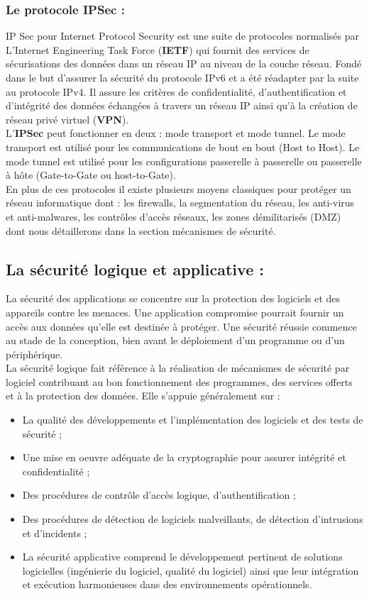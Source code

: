 \subsubsection{Le protocole IPSec :}
IP Sec pour Internet Protocol Security est une suite de protocoles normalisés par L’Internet Engineering Task Force (\textbf{IETF}) qui fournit des services de sécurisations des données dans un réseau IP au niveau de la couche réseau. Fondé dans le but d’assurer la sécurité du protocole IPv6 et a été réadapter par la suite au protocole IPv4. Il assure les critères de confidentialité, d’authentification et d’intégrité des données échangées à travers un réseau IP ainsi qu’à la création de réseau privé virtuel (\textbf{VPN}).\\
L’\textbf{IPSec} peut fonctionner en deux : mode transport et mode tunnel. Le mode transport est utilisé pour les communications de bout en bout (Host to Host). Le mode tunnel est utilisé pour les configurations passerelle à passerelle ou passerelle à hôte (Gate-to-Gate ou host-to-Gate)\cite{ref9}.\\

En plus de ces protocoles il existe plusieurs moyens classiques pour protéger un réseau informatique dont : les firewalls, la segmentation du réseau, les anti-virus et anti-malwares, les contrôles d’accès réseaux, les zones démilitarisés (DMZ) dont nous détaillerons dans la section mécanismes de sécurité.
\subsection{La sécurité logique et applicative :}
La sécurité des applications se concentre sur la protection des logiciels et des appareils contre les menaces. Une application compromise pourrait fournir un accès aux données qu'elle est destinée à protéger. Une sécurité réussie commence au stade de la conception, bien avant le déploiement d'un programme ou d'un périphérique.\\
La sécurité logique fait référence à la réalisation de mécanismes de sécurité par logiciel contribuant au bon fonctionnement des programmes, des services offerts et à la protection des données. Elle s’appuie généralement sur :
\begin{itemize}
\item La qualité des développements et l’implémentation des logiciels et des tests de sécurité ;
\item Une mise en oeuvre adéquate de la cryptographie pour assurer intégrité et confidentialité ;
\item Des procédures de contrôle d’accès logique, d’authentification ;
\item Des procédures de détection de logiciels malveillants, de détection d’intrusions et d’incidents ;
\item La sécurité applicative comprend le développement pertinent de solutions logicielles (ingénierie du logiciel, qualité du logiciel) ainsi que leur intégration et exécution harmonieuses dans des environnements opérationnels.
\end{itemize}
